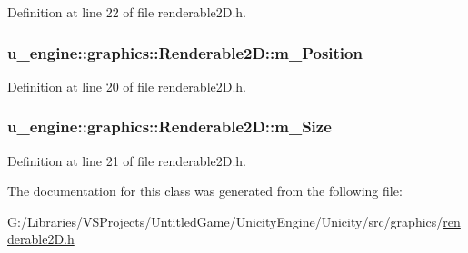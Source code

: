 Definition at line 22 of file renderable2\+D.\+h.

\hypertarget{classu__engine_1_1graphics_1_1_renderable2_d_a9558c847a17ef83a3384359af797b997}{}
\subsubsection[{m\+\_\+\+Position}]{ u\+\_\+engine\+::graphics\+::\+Renderable2\+D\+::m\+\_\+\+Position\hspace{0.3cm}{\ttfamily [protected]}}\label{classu__engine_1_1graphics_1_1_renderable2_d_a9558c847a17ef83a3384359af797b997}


Definition at line 20 of file renderable2\+D.\+h.

\hypertarget{classu__engine_1_1graphics_1_1_renderable2_d_ac3d5d16f629eb4863cf315cccfb6f683}{}
\subsubsection[{m\+\_\+\+Size}]{ u\+\_\+engine\+::graphics\+::\+Renderable2\+D\+::m\+\_\+\+Size\hspace{0.3cm}{\ttfamily [protected]}}\label{classu__engine_1_1graphics_1_1_renderable2_d_ac3d5d16f629eb4863cf315cccfb6f683}


Definition at line 21 of file renderable2\+D.\+h.



The documentation for this class was generated from the following file\+:\begin{DoxyCompactItemize}
\item 
G\+:/\+Libraries/\+V\+S\+Projects/\+Untitled\+Game/\+Unicity\+Engine/\+Unicity/src/graphics/\hyperlink{renderable2_d_8h}{renderable2\+D.\+h}\end{DoxyCompactItemize}

